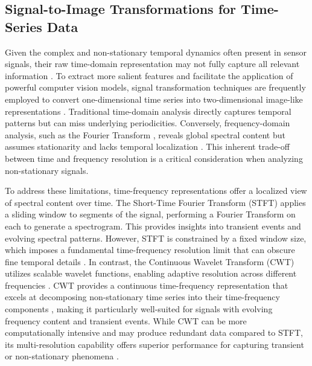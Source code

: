\documentclass{article}
\begin{document}
\subsection{Signal-to-Image Transformations for Time-Series Data}
Given the complex and non-stationary temporal dynamics often present in sensor signals, their raw time-domain representation may not fully capture all relevant information \citep{zhao_zuo_hou_liu_yu_yang_deng_2018}. To extract more salient features and facilitate the application of powerful computer vision models, signal transformation techniques are frequently employed to convert one-dimensional time series into two-dimensional image-like representations \citep{naiman_berman_pemper_arbiv_fadlon_azencot_2024, su_cai_tian_chang_zheng_song_2025}.
Traditional time-domain analysis directly captures temporal patterns but can miss underlying periodicities. Conversely, frequency-domain analysis, such as the Fourier Transform \citep{oppenheim_lim_1981}, reveals global spectral content but assumes stationarity and lacks temporal localization \citep{zhang_yang_wen_li_wang_sun_song_lai_ma_han_2025}. This inherent trade-off between time and frequency resolution is a critical consideration when analyzing non-stationary signals.

To address these limitations, time-frequency representations offer a localized view of spectral content over time. The Short-Time Fourier Transform (STFT) \citep{oppenheim_lim_1981} applies a sliding window to segments of the signal, performing a Fourier Transform on each to generate a spectrogram. This provides insights into transient events and evolving spectral patterns. However, STFT is constrained by a fixed window size, which imposes a fundamental time-frequency resolution limit that can obscure fine temporal details \citep{zhang_yang_wen_li_wang_sun_song_lai_ma_han_2025}. 
In contrast, the Continuous Wavelet Transform (CWT) utilizes scalable wavelet functions, enabling adaptive resolution across different frequencies \citep{mallat_peyre_2009}. CWT provides a continuous time-frequency representation that excels at decomposing non-stationary time series into their time-frequency components \citep{rhif_ben_abbes_farah_martínez_sang_2019}, making it particularly well-suited for signals with evolving frequency content and transient events. While CWT can be more computationally intensive and may produce redundant data compared to STFT, its multi-resolution capability offers superior performance for capturing transient or non-stationary phenomena \citep{rhif_ben_abbes_farah_martínez_sang_2019}.
\end{document}
